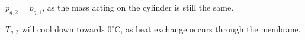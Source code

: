 \( p_{g,2} = p_{g,1} \), as the mass acting on the cylinder is still the same.  

\( T_{g,2} \) will cool down towards \( 0^\circ \text{C} \), as heat exchange occurs through the membrane.